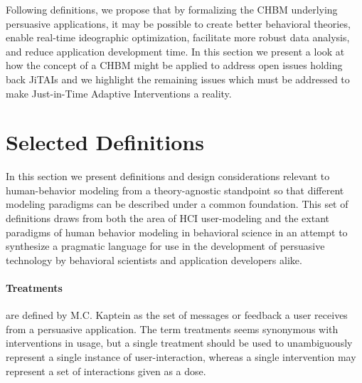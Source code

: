 \documentclass[runningheads,a4paper]{llncs}
\begin{document}
Following definitions, we propose that by formalizing the CHBM underlying persuasive applications, it may be possible to create better behavioral theories, enable real-time ideographic optimization, facilitate more robust data analysis, and reduce application development time. 
In this section we present a look at how the concept of a CHBM might be applied to address open issues holding back JiTAIs and we highlight the remaining issues which must be addressed to make Just-in-Time Adaptive Interventions a reality.

\section{Selected Definitions}

In this section we present definitions and design considerations relevant to human-behavior modeling from a theory-agnostic standpoint so that different modeling paradigms can be described under a common foundation.
This set of definitions draws from both the area of HCI user-modeling and the extant paradigms of human behavior modeling in behavioral science in an attempt to synthesize a pragmatic language for use in the development of persuasive technology by behavioral scientists and application developers alike.

\paragraph{Treatments} are defined by M.C. Kaptein \cite{kaptein2015formalizing} as the set of messages or feedback a user receives from a persuasive application. 
The term treatments seems synonymous with interventions in usage, but a single treatment should be used to unambiguously represent a single instance of user-interaction, whereas a single intervention may represent a set of interactions given as a dose.
\end{document}
